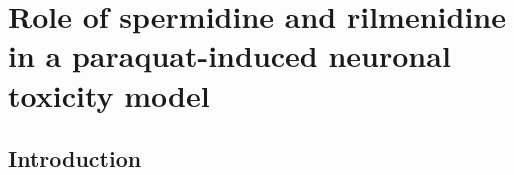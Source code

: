 \chapter{Role of spermidine and rilmenidine in a paraquat-induced neuronal toxicity model}
\section{Introduction}
